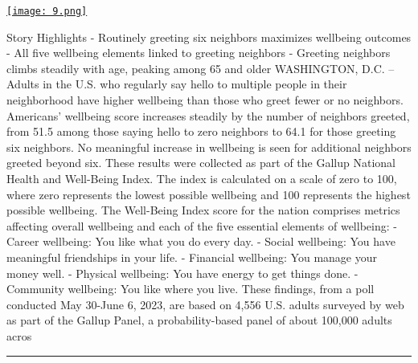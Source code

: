\documentclass[10pt,a4paper]{article}
\begin{document}
\begin{minipage}[t]{0.80\linewidth}
\vspace{0pt}
\begin{multicols}{2}

    \href{https://news.gallup.com/poll/509543/saying-hello-linked-higher-wellbeing-limits.aspx?utm\_source=hackernewsletter\&utm\_medium=email\&utm\_term=fav}{
        \texttt{[image: 9.png]}
    }
  
Story Highlights
- Routinely greeting six neighbors maximizes wellbeing outcomes
- All five wellbeing elements linked to greeting neighbors
- Greeting neighbors climbs steadily with age, peaking among 65 and older
WASHINGTON, D.C. -- Adults in the U.S. who regularly say hello to multiple people in their neighborhood have higher wellbeing than those who greet fewer or no neighbors. Americans’ wellbeing score increases steadily by the number of neighbors greeted, from 51.5 among those saying hello to zero neighbors to 64.1 for those greeting six neighbors. No meaningful increase in wellbeing is seen for additional neighbors greeted beyond six.
These results were collected as part of the Gallup National Health and Well-Being Index. The index is calculated on a scale of zero to 100, where zero represents the lowest possible wellbeing and 100 represents the highest possible wellbeing. The Well-Being Index score for the nation comprises metrics affecting overall wellbeing and each of the five essential elements of wellbeing:
- Career wellbeing: You like what you do every day.
- Social wellbeing: You have meaningful friendships in your life.
- Financial wellbeing: You manage your money well.
- Physical wellbeing: You have energy to get things done.
- Community wellbeing: You like where you live.
These findings, from a poll conducted May 30-June 6, 2023, are based on 4,556 U.S. adults surveyed by web as part of the Gallup Panel, a probability-based panel of about 100,000 adults acros

\end{multicols}
\end{minipage}
\par\medskip
\noindent\textcolor{red}{\rule{\linewidth}{0.2mm}}
\end{document}
